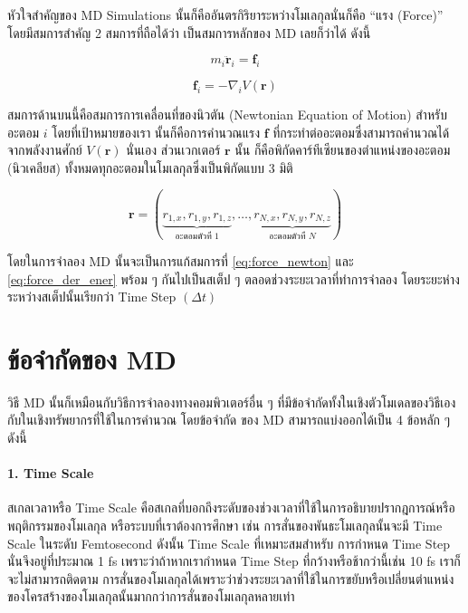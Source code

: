 หัวใจสำคัญของ MD Simulations นั้นก็คืออันตรกิริยาระหว่างโมเลกุลนั่นก็คือ \enquote{แรง (Force)} โดยมีสมการสำคัญ 2 สมการที่ถือได้ว่า%
เป็นสมการหลักของ MD เลยก็ว่าได้ ดังนี้

\begin{equation}
    \label{eq:force_newton}
    m_{i}\bm{\ddot{r}}_{i} = \bm{f}_{i}
\end{equation}

\begin{equation}
    \label{eq:force_der_ener}
    \bm{f}_{i} = -\nabla_{i}V(\bm{r})
\end{equation}

\noindent สมการด้านบนนี้คือสมการการเคลื่อนที่ของนิวตัน (Newtonian Equation of Motion) สำหรับอะตอม $i$ โดยที่เป้าหมายของเรา%
นั้นก็คือการคำนวณแรง $\bm{f}$ ที่กระทำต่ออะตอมซึ่งสามารถคำนวณได้จากพลังงานศักย์ $V(\bm{r})$ นั่นเอง ส่วนเวกเตอร์ $\bm{r}$ นั้น%
ก็คือพิกัดคาร์ทีเซียนของตำแหน่งของอะตอม (นิวเคลียส) ทั้งหมดทุกอะตอมในโมเลกุลซึ่งเป็นพิกัดแบบ 3 มิติ

\begin{equation}
    \bm{r} = (\underbrace{r_{1,x}, r_{1,y}, r_{1,z}}_{\text{อะตอมตัวที่ 1}}, \dots,
    \underbrace{r_{N,x}, r_{N,y}, r_{N,z}}_{\text{อะตอมตัวที่ $N$}})
\end{equation}

โดยในการจำลอง MD นั้นจะเป็นการแก้สมการที่ \eqref{eq:force_newton} และ \eqref{eq:force_der_ener} พร้อม ๆ กันไปเป็นสเต็ป ๆ
ตลอดช่วงระยะเวลาที่ทำการจำลอง โดยระยะห่างระหว่างสเต็ปนั้นเรียกว่า Time Step $(\Delta t)$

\section{ข้อจำกัดของ MD}

วิธี MD นั้นก็เหมือนกับวิธีการจำลองทางคอมพิวเตอร์อื่น ๆ ที่มีข้อจำกัดทั้งในเชิงตัวโมเดลของวิธีเองกับในเชิงทรัพยากรที่ใช้ในการคำนวณ โดยข้อจำกัด%
ของ MD สามารถแบ่งออกได้เป็น 4 ข้อหลัก ๆ ดังนี้

\paragraph{1. Time Scale} สเกลเวลาหรือ Time Scale คือสเกลที่บอกถึงระดับของช่วงเวลาที่ใช้ในการอธิบายปรากฎการณ์หรือพฤติกรรมของโมเลกุล%
หรือระบบที่เราต้องการศึกษา เช่น การสั่นของพันธะโมเลกุลนั้นจะมี Time Scale ในระดับ Femtosecond ดังนั้น Time Scale ที่เหมาะสมสำหรับ%
การกำหนด Time Step นั่นจึงอยู่ที่ประมาณ 1 fs เพราะว่าถ้าหากเรากำหนด Time Step ที่กว้างหรือช้ากว่านี้เช่น 10 fs เราก็จะไม่สามารถติดตาม%
การสั่นของโมเลกุลได้เพราะว่าช่วงระยะเวลาที่ใช้ในการขยับหรือเปลี่ยนตำแหน่งของโครสร้างของโมเลกุลนั้นมากกว่าการสั่นของโมเลกุลหลายเท่า

